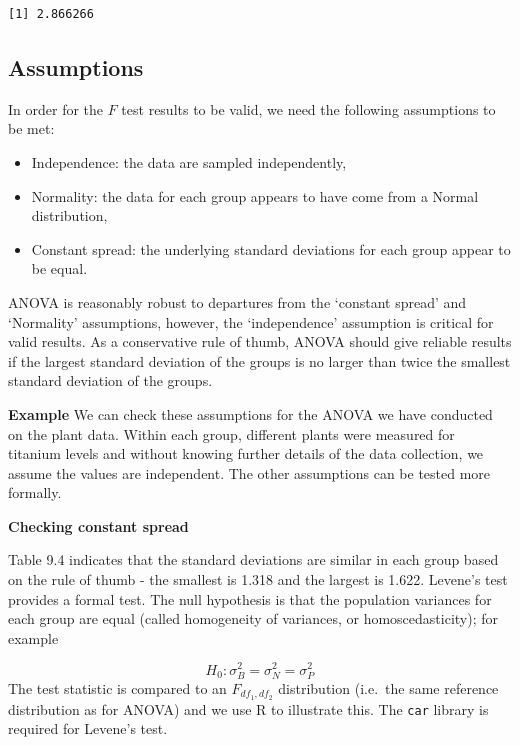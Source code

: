 \documentclass[
  oneside]{krantz}
\providecommand{\tightlist}{%
  \setlength{\itemsep}{0pt}\setlength{\parskip}{0pt}}
\begin{document}
\begin{verbatim}
[1] 2.866266
\end{verbatim}

\hypertarget{assumptions}{%
\subsection{Assumptions}\label{assumptions}}

In order for the \(F\) test results to be valid, we need the following assumptions to be met:

\begin{itemize}
\tightlist
\item
  Independence: the data are sampled independently,
\item
  Normality: the data for each group appears to have come from a Normal distribution,
\item
  Constant spread: the underlying standard deviations for each group appear to be equal.
\end{itemize}

ANOVA is reasonably robust to departures from the `constant spread' and `Normality' assumptions, however, the `independence' assumption is critical for valid results. As a conservative rule of thumb, ANOVA should give reliable results if the largest standard deviation of the groups is no larger than twice the smallest standard deviation of the groups.

\textbf{Example} We can check these assumptions for the ANOVA we have conducted on the plant data. Within each group, different plants were measured for titanium levels and without knowing further details of the data collection, we assume the values are independent. The other assumptions can be tested more formally.

\textbf{Checking constant spread}

Table 9.4 indicates that the standard deviations are similar in each group based on the rule of thumb - the smallest is 1.318 and the largest is 1.622. Levene's test provides a formal test. The null hypothesis is that the population variances for each group are equal (called homogeneity of variances, or homoscedasticity); for example

\[H_0: \sigma_B^2 = \sigma_N^2 = \sigma_P^2 \]
The test statistic is compared to an \(F_{df_1,df_2}\) distribution (i.e.~the same reference distribution as for ANOVA) and we use R to illustrate this. The \texttt{car} \citep{Fox2019} library is required for Levene's test.
\end{document}
